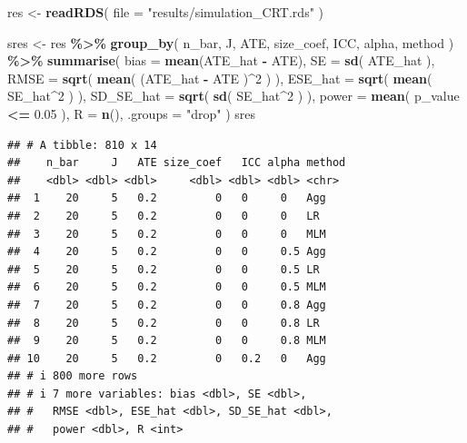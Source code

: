 \documentclass[
]{book}
\newenvironment{Shaded}{\begin{snugshade}}{\end{snugshade}}
\newcommand{\AttributeTok}[1]{\textcolor[rgb]{0.13,0.29,0.53}{#1}}
\newcommand{\DecValTok}[1]{\textcolor[rgb]{0.00,0.00,0.81}{#1}}
\newcommand{\FloatTok}[1]{\textcolor[rgb]{0.00,0.00,0.81}{#1}}
\newcommand{\FunctionTok}[1]{\textcolor[rgb]{0.13,0.29,0.53}{\textbf{#1}}}
\newcommand{\NormalTok}[1]{#1}
\newcommand{\OtherTok}[1]{\textcolor[rgb]{0.56,0.35,0.01}{#1}}
\newcommand{\SpecialCharTok}[1]{\textcolor[rgb]{0.81,0.36,0.00}{\textbf{#1}}}
\newcommand{\StringTok}[1]{\textcolor[rgb]{0.31,0.60,0.02}{#1}}
\begin{document}
\begin{Shaded}
\begin{Highlighting}[]
\NormalTok{res }\OtherTok{\textless{}{-}} \FunctionTok{readRDS}\NormalTok{( }\AttributeTok{file =} \StringTok{"results/simulation\_CRT.rds"}\NormalTok{ )}

\NormalTok{sres }\OtherTok{\textless{}{-}} 
\NormalTok{  res }\SpecialCharTok{\%\textgreater{}\%} 
  \FunctionTok{group\_by}\NormalTok{( n\_bar, J, ATE, size\_coef, ICC, alpha, method ) }\SpecialCharTok{\%\textgreater{}\%}
  \FunctionTok{summarise}\NormalTok{( }
    \AttributeTok{bias =} \FunctionTok{mean}\NormalTok{(ATE\_hat }\SpecialCharTok{{-}}\NormalTok{ ATE),}
    \AttributeTok{SE =} \FunctionTok{sd}\NormalTok{( ATE\_hat ),}
    \AttributeTok{RMSE =} \FunctionTok{sqrt}\NormalTok{( }\FunctionTok{mean}\NormalTok{( (ATE\_hat }\SpecialCharTok{{-}}\NormalTok{ ATE )}\SpecialCharTok{\^{}}\DecValTok{2}\NormalTok{ ) ),}
    \AttributeTok{ESE\_hat =} \FunctionTok{sqrt}\NormalTok{( }\FunctionTok{mean}\NormalTok{( SE\_hat}\SpecialCharTok{\^{}}\DecValTok{2}\NormalTok{ ) ),}
    \AttributeTok{SD\_SE\_hat =} \FunctionTok{sqrt}\NormalTok{( }\FunctionTok{sd}\NormalTok{( SE\_hat}\SpecialCharTok{\^{}}\DecValTok{2}\NormalTok{ ) ),}
    \AttributeTok{power =} \FunctionTok{mean}\NormalTok{( p\_value }\SpecialCharTok{\textless{}=} \FloatTok{0.05}\NormalTok{ ),}
    \AttributeTok{R =} \FunctionTok{n}\NormalTok{(),}
    \AttributeTok{.groups =} \StringTok{"drop"}
\NormalTok{  )}
\NormalTok{sres}
\end{Highlighting}
\end{Shaded}

\begin{verbatim}
## # A tibble: 810 x 14
##    n_bar     J   ATE size_coef   ICC alpha method
##    <dbl> <dbl> <dbl>     <dbl> <dbl> <dbl> <chr> 
##  1    20     5   0.2         0   0     0   Agg   
##  2    20     5   0.2         0   0     0   LR    
##  3    20     5   0.2         0   0     0   MLM   
##  4    20     5   0.2         0   0     0.5 Agg   
##  5    20     5   0.2         0   0     0.5 LR    
##  6    20     5   0.2         0   0     0.5 MLM   
##  7    20     5   0.2         0   0     0.8 Agg   
##  8    20     5   0.2         0   0     0.8 LR    
##  9    20     5   0.2         0   0     0.8 MLM   
## 10    20     5   0.2         0   0.2   0   Agg   
## # i 800 more rows
## # i 7 more variables: bias <dbl>, SE <dbl>,
## #   RMSE <dbl>, ESE_hat <dbl>, SD_SE_hat <dbl>,
## #   power <dbl>, R <int>
\end{verbatim}
\end{document}
